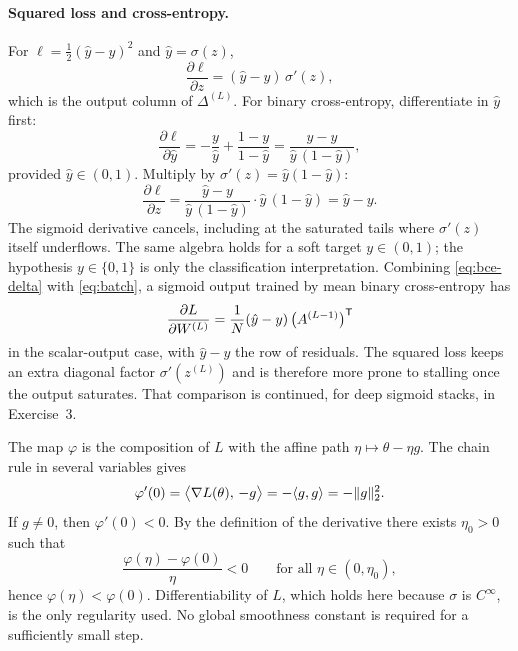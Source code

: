 \paragraph{Squared loss and cross-entropy.}
For \(\ell = \tfrac12(\hat y - y)^2\) and \(\hat y = \sigma(z)\),
\[
  \frac{\partial \ell}{\partial z} = (\hat y - y)\,\sigma'(z),
\]
which is the output column of \(\Delta^{(L)}\). For binary cross-entropy, differentiate in \(\hat y\) first:
\[
  \frac{\partial \ell}{\partial \hat y}
  =
  -\frac{y}{\hat y} + \frac{1-y}{1-\hat y}
  =
  \frac{\hat y - y}{\hat y\,(1-\hat y)},
\]
provided \(\hat y\in(0,1)\). Multiply by \(\sigma'(z) = \hat y(1-\hat y)\):
\begin{equation}
  \frac{\partial \ell}{\partial z}
  =
  \frac{\hat y - y}{\hat y\,(1-\hat y)}\cdot \hat y\,(1-\hat y)
  =
  \hat y - y.
  \label{eq:bce-delta}
\end{equation}
The sigmoid derivative cancels, including at the saturated tails where \(\sigma'(z)\) itself underflows. The same algebra holds for a soft target \(y\in(0,1)\); the hypothesis \(y\in\{0,1\}\) is only the classification interpretation. Combining \eqref{eq:bce-delta} with \eqref{eq:batch}, a sigmoid output trained by mean binary cross-entropy has
\[
  \frac{\partial L}{\partial W^{(L)}}
  =
  \frac1N (\hat y - y)\,\bigl(A^{(L-1)}\bigr)^{\mathsf{T}}
\]
in the scalar-output case, with \(\hat y - y\) the row of residuals. The squared loss keeps an extra diagonal factor \(\sigma'(z^{(L)})\) and is therefore more prone to stalling once the output saturates. That comparison is continued, for deep sigmoid stacks, in Exercise~3.


The map \(\varphi\) is the composition of \(L\) with the affine path \(\eta\mapsto \theta - \eta g\). The chain rule in several variables gives
\[
  \varphi'(0)
  =
  \bigl\langle \nabla L(\theta),\, -g\bigr\rangle
  =
  -\langle g, g\rangle
  =
  -\lVert g\rVert_2^2.
\]
If \(g\neq 0\), then \(\varphi'(0) < 0\). By the definition of the derivative there exists \(\eta_0>0\) such that
\[
  \frac{\varphi(\eta)-\varphi(0)}{\eta} < 0
  \qquad\text{for all }\eta\in(0,\eta_0),
\]
hence \(\varphi(\eta) < \varphi(0)\). Differentiability of \(L\), which holds here because \(\sigma\) is \(C^\infty\), is the only regularity used. No global smoothness constant is required for a sufficiently small step.

